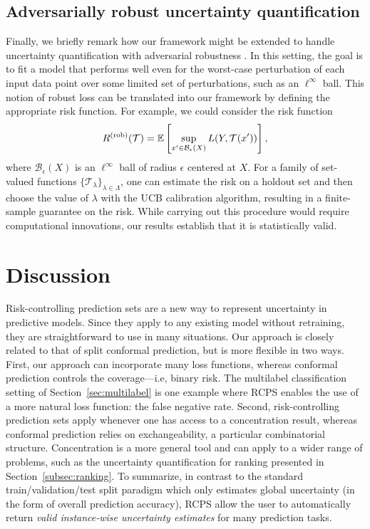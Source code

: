 \documentclass[10pt]{article}
\def\E{\mathbb{E}}
\newcommand{\T}{\mathcal{T}}
\begin{document}
\subsection{Adversarially robust uncertainty quantification}
Finally, we briefly remark how our framework might be extended to handle uncertainty quantification with adversarial robustness \cite[see, e.g.,][]{madry2018, carmon2019unlabeled}. In this setting, the goal is to fit a model that performs well even for the worst-case perturbation of each input data point over some limited set of perturbations, such as an $\ell^\infty$ ball. This notion of robust loss can be translated into our framework by defining the appropriate risk function. For example, we could consider the risk function
\begin{equation*}
    R^{\textnormal{(rob)}}(\T) = \E\left[\sup_{x' \in \mathcal{B}_\epsilon(X)} L(Y, \T(x')) \right],
\end{equation*}
where $\mathcal{B}_\epsilon(X)$ is an $\ell^\infty$ ball of radius $\epsilon$ centered at $X$. For a family of set-valued functions $\{\T_\lambda\}_{\lambda \in \Lambda}$, one can estimate the risk on a holdout set and then choose the value of $\lambda$ with the UCB calibration algorithm, resulting in a finite-sample guarantee on the risk. While carrying out this procedure would require computational innovations, our results establish that it is statistically valid.

\section{Discussion}
Risk-controlling prediction sets are a new way to represent uncertainty in predictive models. Since they apply to any existing model without retraining, they are straightforward to use in many situations. Our approach is closely related to that of split conformal prediction, but is more flexible in two ways. First, our approach can incorporate many loss functions, whereas conformal prediction controls the coverage---i.e, binary risk. The multilabel classification setting of Section~\ref{sec:multilabel} is one example where RCPS enables the use of a more natural loss function: the false negative rate.
Second, risk-controlling prediction sets apply whenever one has access to a concentration result, whereas conformal prediction relies on exchangeability, a particular combinatorial structure. Concentration is a more general tool and can apply to a wider range of problems, such as the uncertainty quantification for ranking presented in Section~\ref{subsec:ranking}. To summarize, in contrast to the standard train/validation/test split paradigm which only estimates global uncertainty (in the form of overall prediction accuracy), RCPS allow the user to automatically return \emph{valid instance-wise uncertainty estimates} for many prediction tasks.
\end{document}
